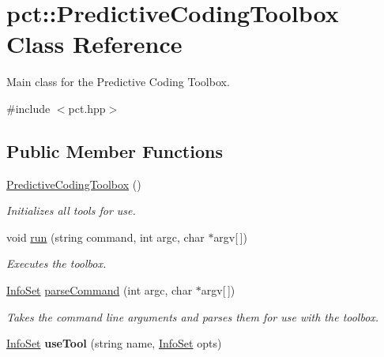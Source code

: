 \hypertarget{classpct_1_1_predictive_coding_toolbox}{\section{pct\-:\-:Predictive\-Coding\-Toolbox Class Reference}
\label{classpct_1_1_predictive_coding_toolbox}
}


Main class for the Predictive Coding Toolbox.  




{\ttfamily \#include $<$pct.\-hpp$>$}

\subsection*{Public Member Functions}
\begin{DoxyCompactItemize}
\item 
\hyperlink{classpct_1_1_predictive_coding_toolbox_a738249091d7f25470def00a043a61360}{Predictive\-Coding\-Toolbox} ()
\begin{DoxyCompactList}\small\item\em Initializes all tools for use. \end{DoxyCompactList}\item 
\hypertarget{classpct_1_1_predictive_coding_toolbox_a3f767b1a8ad48b0d137fb8b130d8146d}{void \hyperlink{classpct_1_1_predictive_coding_toolbox_a3f767b1a8ad48b0d137fb8b130d8146d}{run} (string command, int argc, char $\ast$argv\mbox{[}$\,$\mbox{]})}\label{classpct_1_1_predictive_coding_toolbox_a3f767b1a8ad48b0d137fb8b130d8146d}

\begin{DoxyCompactList}\small\item\em Executes the toolbox. \end{DoxyCompactList}\item 
\hypertarget{classpct_1_1_predictive_coding_toolbox_a1c0ddaf737adc6952e2ed90d6e8186b5}{\hyperlink{classpct_1_1_info_set}{Info\-Set} \hyperlink{classpct_1_1_predictive_coding_toolbox_a1c0ddaf737adc6952e2ed90d6e8186b5}{parse\-Command} (int argc, char $\ast$argv\mbox{[}$\,$\mbox{]})}\label{classpct_1_1_predictive_coding_toolbox_a1c0ddaf737adc6952e2ed90d6e8186b5}

\begin{DoxyCompactList}\small\item\em Takes the command line arguments and parses them for use with the toolbox. \end{DoxyCompactList}\item 
\hypertarget{classpct_1_1_predictive_coding_toolbox_a9aea293167fac653b5a2f88ae5b395a0}{\hyperlink{classpct_1_1_info_set}{Info\-Set} {\bfseries use\-Tool} (string name, \hyperlink{classpct_1_1_info_set}{Info\-Set} opts)}\label{classpct_1_1_predictive_coding_toolbox_a9aea293167fac653b5a2f88ae5b395a0}


\end{DoxyCompactItemize}
